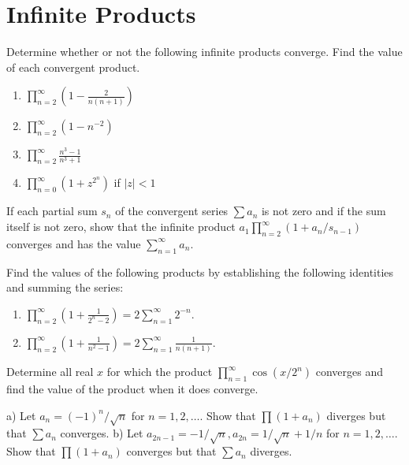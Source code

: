 \section{Infinite Products}

\begin{problembox}
Determine whether or not the following infinite products converge. Find the value of each convergent product.
\begin{enumerate}[label=\alph*)]
\item \(\prod_{n=2}^{\infty} \left( 1 - \frac{2}{n(n+1)} \right)\)
\item \(\prod_{n=2}^{\infty} (1 - n^{-2})\)
\item \(\prod_{n=2}^{\infty} \frac{n^3 - 1}{n^3 + 1}\)
\item \(\prod_{n=0}^{\infty} (1 + z^{2^n})\) if \(|z| < 1\)
\end{enumerate}
\end{problembox}

\begin{problembox}
If each partial sum \(s_n\) of the convergent series \(\sum a_n\) is not zero and if the sum itself is not zero, show that the infinite product \(a_1 \prod_{n=2}^{\infty} (1 + a_n / s_{n-1})\) converges and has the value \(\sum_{n=1}^{\infty} a_n\).
\end{problembox}

\begin{problembox}
Find the values of the following products by establishing the following identities and summing the series:
\begin{enumerate}[label=\alph*)]
\item \(\prod_{n=2}^{\infty} \left( 1 + \frac{1}{2^n - 2} \right) = 2 \sum_{n=1}^{\infty} 2^{-n}\).
\item \(\prod_{n=2}^{\infty} \left( 1 + \frac{1}{n^2 - 1} \right) = 2 \sum_{n=1}^{\infty} \frac{1}{n(n+1)}\).
\end{enumerate}
\end{problembox}

\begin{problembox}
Determine all real \(x\) for which the product \(\prod_{n=1}^{\infty} \cos (x/2^n)\) converges and find the value of the product when it does converge.
\end{problembox}

\begin{problembox}
a) Let \(a_n = (-1)^n/\sqrt{n}\) for \(n = 1, 2, \ldots\). Show that \(\prod (1 + a_n)\) diverges but that \(\sum a_n\) converges.
b) Let \(a_{2n-1} = -1/\sqrt{n}, a_{2n} = 1/\sqrt{n} + 1/n\) for \(n = 1, 2, \ldots\). Show that \(\prod (1 + a_n)\) converges but that \(\sum a_n\) diverges.
\end{problembox}

